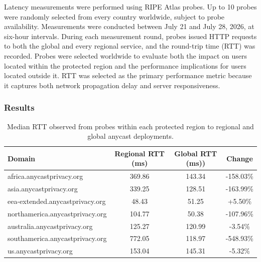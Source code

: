 \documentclass[acmsmall]{acmart}
\begin{document}
Latency measurements were performed using RIPE Atlas probes. Up to 10 probes were randomly selected from every country worldwide, subject to probe availability. Measurements were conducted between July 21 and July 28, 2026, at six-hour intervals. During each measurement round, probes issued HTTP requests to both the global and every regional service, and the round-trip time (RTT) was recorded. Probes were selected worldwide to evaluate both the impact on users located within the protected region and the performance implications for users located outside it. RTT was selected as the primary performance metric because it captures both network propagation delay and server responsiveness.

\subsubsection{Results}

\begin{table}[ht]
    \centering
    \begin{tabular}{lccc}
        \toprule
        \textbf{Domain} & \textbf{Regional RTT (ms)} & \textbf{Global RTT (ms))} & \textbf{Change} \\
        \midrule
        africa.anycastprivacy.org & 369.86 & 143.34 & -158.03\% \\
        asia.anycastprivacy.org & 339.25 & 128.51 & -163.99\% \\
        eea-extended.anycastprivacy.org & 48.43 & 51.25 & +5.50\% \\
        northamerica.anycastprivacy.org & 104.77 & 50.38 & -107.96\% \\
        australia.anycastprivacy.org & 125.27 & 120.99 & -3.54\% \\
        southamerica.anycastprivacy.org & 772.05 & 118.97 & -548.93\% \\
        us.anycastprivacy.org & 153.04 & 145.31 & -5.32\% \\
        \bottomrule
    \end{tabular}
    \caption{Median RTT observed from probes within each protected region to regional and global anycast deployments.}
    \label{tab:median_rtt_comparison_regions}
\end{table}
\end{document}
